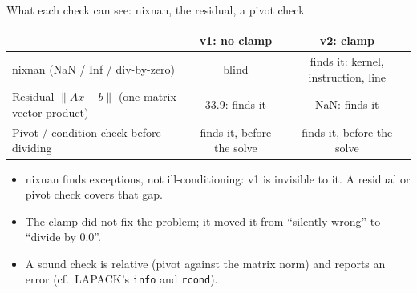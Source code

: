 \documentclass[aspectratio=169,10pt,xcolor=table]{beamer}
\begin{document}
\begin{frame}{What each check can see: nixnan, the residual, a pivot check}
\centering\small
\begin{tabular}{lcc}
\toprule
 & v1: no clamp & v2: clamp\\
\midrule
nixnan (NaN / Inf / div-by-zero) & \cellcolor{red!12}blind & \cellcolor{green!12}finds it: kernel, instruction, line\\
Residual $\|Ax-b\|$ (one matrix-vector product) & \cellcolor{green!12}33.9: finds it & \cellcolor{green!12}NaN: finds it\\
Pivot / condition check before dividing & \cellcolor{green!12}finds it, before the solve & \cellcolor{green!12}finds it, before the solve\\
\bottomrule
\end{tabular}

\vspace{4mm}

\vspace{3mm}\raggedright\footnotesize
\begin{itemize}
\item nixnan finds exceptions, not ill-conditioning: v1 is invisible to it. A residual or pivot check covers that gap.
\item The clamp did not fix the problem; it moved it from ``silently wrong'' to ``divide by 0.0''.
\item A sound check is relative (pivot against the matrix norm) and reports an error (cf.\ LAPACK's \texttt{info} and \texttt{rcond}).
\end{itemize}
\end{frame}
\end{document}

